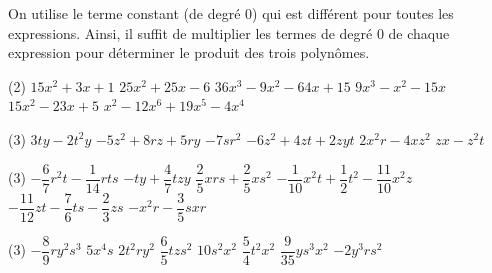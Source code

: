 \documentclass[a4paper,12pt]{report}
\begin{document}
\begin{core}
	On utilise le terme constant (de degré 0) qui est différent pour toutes les expressions. Ainsi, il suffit de multiplier les termes de degré 0 de chaque expression pour déterminer le produit des trois polynômes. 
\end{core}

\begin{core}
	\phantom{}
\begin{tasks}(2) \task $15x^2 + 3x + 1 $
\task $ 25x^2 + 25x - 6$
\task $ 36x^3 - 9x^2 - 64x + 15$
\task $ 9x^3 - x^2 - 15x$ 
\task $ 15x^2 - 23x + 5 $
\task $ x^2 - 12x^6 + 19x^5 - 4x^4$ \end{tasks}
\end{core}


\begin{core}\phantom{ }

\begin{tasks}(3)
\task ${{3 t y-2 t^2 y}}$
\task ${{-5 z^2 + 8 r z + 5 r y}}$
\task ${{-7 s r^2}}$
\task ${{-6 z^2 + 4 z t + 2 z y t}}$
\task ${{2 x^2 r-4 x z^2}}$
\task ${{z x-z^2 t}}$
\end{tasks}

\end{core}

\begin{core}\phantom{ }

\begin{tasks}(3)
\task ${{-\dfrac{6}{7} r^2 t-\dfrac{1}{14} r t s}}$
\task ${{-t y + \dfrac{4}{7} t z y}}$
\task ${{\dfrac{2}{5} x r s + \dfrac{2}{5} x s^2}}$
\task ${{-\dfrac{1}{10} x^2 t + \dfrac{1}{2} t^2-\dfrac{11}{10} x^2 z}}$
\task ${{-\dfrac{11}{12} z t-\dfrac{7}{6} t s-\dfrac{2}{3} z s}}$
\task ${{-x^2 r-\dfrac{3}{5} s x r}}$
\end{tasks}

\end{core}


\begin{core}\phantom{ }

\begin{tasks}(3)
\task ${{-\dfrac{8}{9} r y^2 s^3}}$
\task ${{5 x^4 s}}$
\task ${{2 t^2 r y^2}}$
\task ${{\dfrac{6}{5} t z s^2}}$
\task ${{10 s^2 x^2}}$
\task ${{\dfrac{5}{4} t^2 x^2}}$
\task ${{\dfrac{9}{35} y s^3 x^2}}$
\task ${{-2 y^3 r s^2}}$
\end{tasks}

\end{core}
\end{document}
